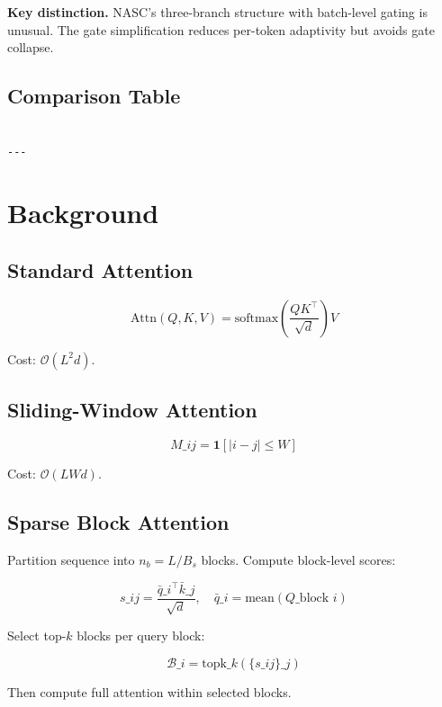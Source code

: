 \textbf{Key distinction.} NASC's three-branch structure with batch-level gating 
is unusual. The gate simplification reduces per-token adaptivity but 
avoids gate collapse.



\subsection{Comparison Table}

\begin{lstlisting}

---
\end{lstlisting}


\section{Background}

\subsection{Standard Attention}

\[
\text{Attn}(Q, K, V) = \text{softmax}\!\left(\frac{QK^\top}{\sqrt{d}}\right)V
\tag{3.1}
\]

Cost: $\mathcal{O}(L^2 d)$.

\subsection{Sliding-Window Attention}

\[
M\_{ij} = \mathbf{1}[|i - j| \leq W]
\tag{3.2}
\]

Cost: $\mathcal{O}(L W d)$.

\subsection{Sparse Block Attention}

Partition sequence into $n_b = L / B_s$ blocks. Compute block-level scores:

\[
s\_{ij} = \frac{\bar{q}\_i^\top \bar{k}\_j}{\sqrt{d}}, \quad \bar{q}\_i = \text{mean}(Q\_{\text{block } i})
\tag{3.3}
\]

Select top-$k$ blocks per query block:

\[
\mathcal{B}\_i = \text{topk}\_{k}(\{s\_{ij}\}\_j)
\tag{3.4}
\]

Then compute full attention within selected blocks.

